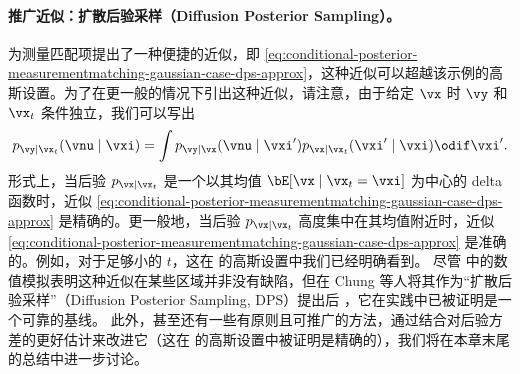\documentclass[../../book-main_zh.tex]{subfiles}
\begin{document}
\paragraph{推广近似：扩散后验采样（Diffusion Posterior Sampling）。}
 为测量匹配项提出了一种便捷的近似，即
\eqref{eq:conditional-posterior-measurementmatching-gaussian-case-dps-approx}，这种近似可以超越该示例的高斯设置。为了在更一般的情况下引出这种近似，请注意，由于给定 $\vx$ 时 $\vy$ 和 $\vx_t$ 条件独立，我们可以写出
\begin{equation}
    p_{\vy \mid \vx_t}(\vnu \mid \vxi)
    =
    \int p_{\vy \mid \vx}(\vnu \mid \vxi') p_{\vx \mid \vx_t}(\vxi' \mid \vxi)
    \odif  \vxi'.
\end{equation}
形式上，当后验 $p_{\vx\mid \vx_t}$ 是一个以其均值 $\bE[\vx \mid \vx_t=\vxi]$ 为中心的 delta 函数时，近似
\eqref{eq:conditional-posterior-measurementmatching-gaussian-case-dps-approx} 是精确的。更一般地，当后验 $p_{\vx \mid \vx_t}$ 高度集中在其均值附近时，近似
\eqref{eq:conditional-posterior-measurementmatching-gaussian-case-dps-approx} 是准确的。例如，对于足够小的 $t$，这在
 的高斯设置中我们已经明确看到。
尽管  中的数值模拟表明这种近似在某些区域并非没有缺陷，但在 Chung 等人将其作为“扩散后验采样”（Diffusion Posterior Sampling, DPS）提出后 \cite{chung2023diffusion}，它在实践中已被证明是一个可靠的基线。
此外，甚至还有一些有原则且可推广的方法，通过结合对后验方差的更好估计来改进它（这在  的高斯设置中被证明是精确的），我们将在本章末尾的总结中进一步讨论。
\end{document}
